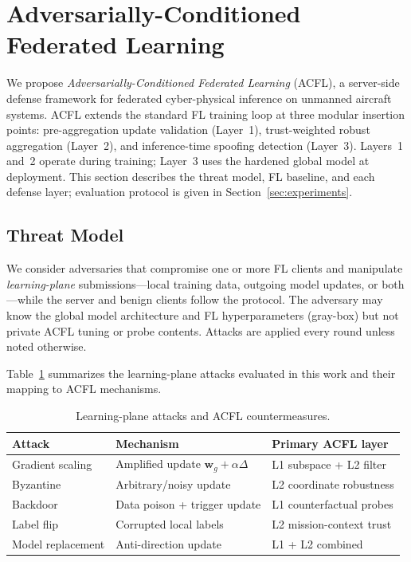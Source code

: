 
\section{Adversarially-Conditioned Federated Learning}
\label{sec:method}

We propose \emph{Adversarially-Conditioned Federated Learning} (ACFL), a server-side defense framework for federated cyber-physical inference on unmanned aircraft systems.
ACFL extends the standard FL training loop at three modular insertion points: pre-aggregation update validation (Layer~1), trust-weighted robust aggregation (Layer~2), and inference-time spoofing detection (Layer~3).
Layers~1 and~2 operate during training; Layer~3 uses the hardened global model at deployment.
This section describes the threat model, FL baseline, and each defense layer; evaluation protocol is given in Section~\ref{sec:experiments}.

\subsection{Threat Model}
\label{sec:method-threat}

We consider adversaries that compromise one or more FL clients and manipulate \emph{learning-plane} submissions---local training data, outgoing model updates, or both---while the server and benign clients follow the protocol.
The adversary may know the global model architecture and FL hyperparameters (gray-box) but not private ACFL tuning or probe contents.
Attacks are applied every round unless noted otherwise.

Table~\ref{tab:attacks-method} summarizes the learning-plane attacks evaluated in this work and their mapping to ACFL mechanisms.

\begin{table}[t]
\centering
\caption{Learning-plane attacks and ACFL countermeasures.}
\label{tab:attacks-method}
\small
\setlength{\tabcolsep}{3pt}
\begin{tabular}{@{}p{}p{}p{}@{}}
\toprule
Attack & Mechanism & Primary ACFL layer \\
\midrule
Gradient scaling & Amplified update $\mathbf{w}_g + \alpha\Delta$ & L1 subspace + L2 filter \\
Byzantine & Arbitrary/noisy update & L2 coordinate robustness \\
Backdoor & Data poison + trigger update & L1 counterfactual probes \\
Label flip & Corrupted local labels & L2 mission-context trust \\
Model replacement & Anti-direction update & L1 + L2 combined \\
\bottomrule
\end{tabular}
\end{table}

